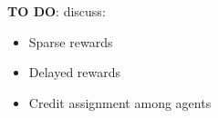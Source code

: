 \textbf{TO DO}: discuss:
\begin{itemize}
    \item Sparse rewards
    \item Delayed rewards
    \item Credit assignment among agents
\end{itemize}